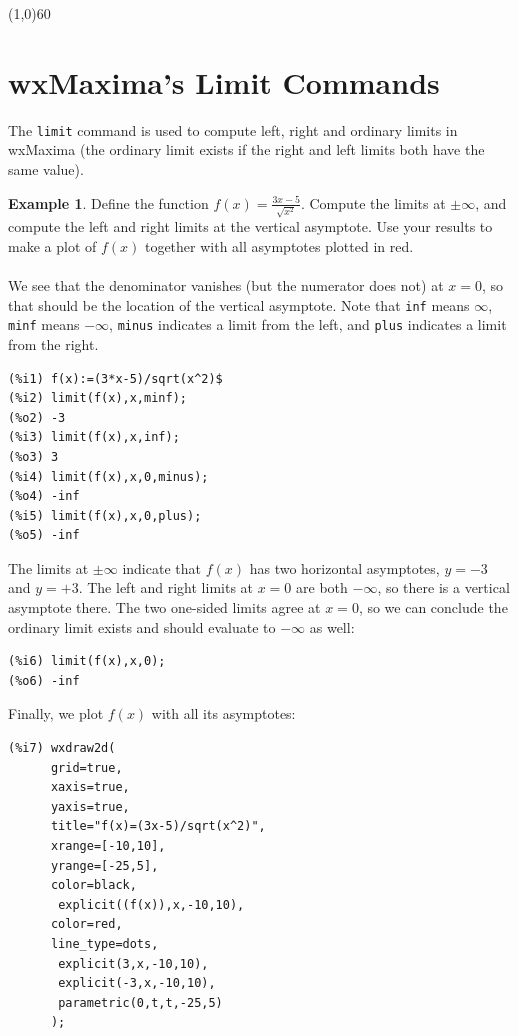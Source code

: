 \documentclass[10.5pt,twoside]{report}
\theoremstyle{definition}
\newtheorem{exmp}{Example}[section]
\begin{document}
\line(1,0){60}
\linethickness{0.5mm}

\pagebreak

\section{wxMaxima's Limit Commands}\label{wxMaxima's Limit Commands}

The \verb|limit| command is used to compute left, right and ordinary limits in wxMaxima (the ordinary limit exists if the right and left limits both have the same value).

\begin{exmp}  

Define the function $f(x)=\frac{3x-5}{\sqrt{x^2}}$.  Compute the limits at $\pm \infty$, and compute the left and right limits at the vertical asymptote.  Use your results to make a plot of $f(x)$ together with all asymptotes plotted in red.\\
${}$\\

We see that the denominator vanishes (but the numerator does not) at $x=0$, so that should be the location of the vertical asymptote.  Note that \verb|inf| means $\infty$, \verb|minf| means $-\infty$, \verb|minus| indicates a limit from the left, and \verb|plus| indicates a limit from the right.

\begin{verbatim}
(%i1) f(x):=(3*x-5)/sqrt(x^2)$
(%i2) limit(f(x),x,minf);
(%o2) -3
(%i3) limit(f(x),x,inf);
(%o3) 3
(%i4) limit(f(x),x,0,minus);
(%o4) -inf
(%i5) limit(f(x),x,0,plus);
(%o5) -inf
\end{verbatim}

The limits at $\pm \infty$ indicate that $f(x)$ has two horizontal asymptotes, $y=-3$ and $y=+3$.  The left and right limits at $x=0$ are both $-\infty$, so there is a vertical asymptote there.  The two one-sided limits agree at $x=0$, so we can conclude the ordinary limit exists and should evaluate to $-\infty$ as well:

\begin{verbatim}
(%i6) limit(f(x),x,0);
(%o6) -inf
\end{verbatim}

Finally, we plot $f(x)$ with all its asymptotes:

\begin{verbatim}
(%i7) wxdraw2d(
      grid=true,
      xaxis=true,
      yaxis=true,
      title="f(x)=(3x-5)/sqrt(x^2)",
      xrange=[-10,10],
      yrange=[-25,5],
      color=black,
       explicit((f(x)),x,-10,10),
      color=red,
      line_type=dots,
       explicit(3,x,-10,10),
       explicit(-3,x,-10,10),
       parametric(0,t,t,-25,5)
      );
\end{verbatim}


\end{exmp}
\end{document}
